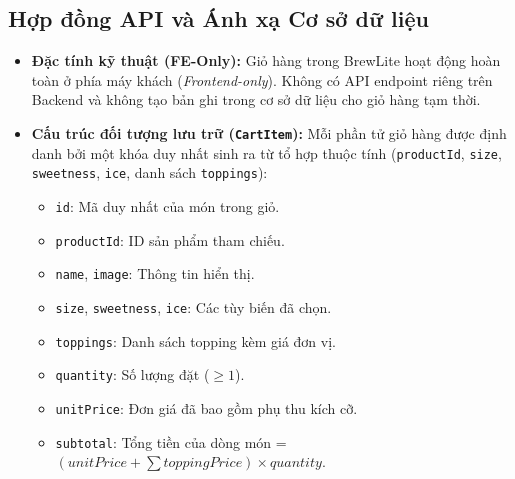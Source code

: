 \subsection{Hợp đồng API và Ánh xạ Cơ sở dữ liệu}
\begin{itemize}
    \item \textbf{Đặc tính kỹ thuật (FE-Only):} Giỏ hàng trong BrewLite hoạt động hoàn toàn ở phía máy khách (\textit{Frontend-only}). Không có API endpoint riêng trên Backend và không tạo bản ghi trong cơ sở dữ liệu cho giỏ hàng tạm thời.
    \item \textbf{Cấu trúc đối tượng lưu trữ (\texttt{CartItem}):}
    Mỗi phần tử giỏ hàng được định danh bởi một khóa duy nhất sinh ra từ tổ hợp thuộc tính (\texttt{productId}, \texttt{size}, \texttt{sweetness}, \texttt{ice}, danh sách \texttt{toppings}):
    \begin{itemize}
        \item \texttt{id}: Mã duy nhất của món trong giỏ.
        \item \texttt{productId}: ID sản phẩm tham chiếu.
        \item \texttt{name}, \texttt{image}: Thông tin hiển thị.
        \item \texttt{size}, \texttt{sweetness}, \texttt{ice}: Các tùy biến đã chọn.
        \item \texttt{toppings}: Danh sách topping kèm giá đơn vị.
        \item \texttt{quantity}: Số lượng đặt (\(\ge 1\)).
        \item \texttt{unitPrice}: Đơn giá đã bao gồm phụ thu kích cỡ.
        \item \texttt{subtotal}: Tổng tiền của dòng món = \((unitPrice + \sum toppingPrice) \times quantity\).
    \end{itemize}
\end{itemize}

